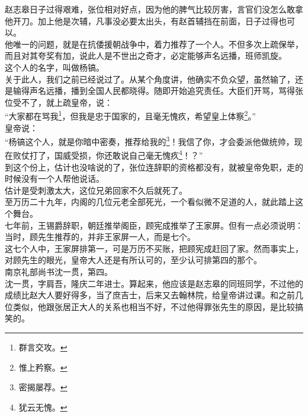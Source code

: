\begin{multicols}{\theparacolNo}
赵志皋日子过得艰难，张位相对好点，因为他的脾气比较厉害，言官们没怎么敢拿他开刀。加上他是次辅，凡事没必要太出头，有赵首辅挡在前面，日子过得也可以。\\

他唯一的问题，就是在抗倭援朝战争中，着力推荐了一个人。不但多次上疏保举，而且对其夸奖有加，说此人是不世出之奇才，必定能够声名远播，班师凯旋。\\

这个人的名字，叫做杨镐。\\

关于此人，我们之前已经说过了。从某个角度讲，他确实不负众望，虽然输了，还是输得声名远播，播到全国人民都晓得。随即开始追究责任。大臣们开骂，骂得张位受不了，就上疏皇帝，说：\\

“大家都在骂我\footnote{群言交攻。}，但我是忠于国家的，且毫无愧疚，希望皇上体察\footnote{惟上矜察。}。”\\

皇帝说：\\

“杨镐这个人，就是你暗中密奏，推荐给我的\footnote{密揭屡荐。}！我信了你，才会委派他做统帅，现在败仗打了，国威受损，你还敢说自己毫无愧疚\footnote{犹云无愧。}！？”\\

到这个份上，估计也没啥说的了，张位连辞职的资格都没有，就被皇帝免职，走的时候没有一个人帮他说话。\\

估计是受刺激太大，这位兄弟回家不久后就死了。\\

至万历二十九年，内阁的几位元老全部死光，一个看似微不足道的人，就此踏上这个舞台。\\

七年前，王锡爵辞职，朝廷推举阁臣，顾宪成推举了王家屏。但有一点必须说明：当时，顾先生推荐的，并非王家屏一人，而是七个。\\

这七个人中，王家屏排第一，可是万历不买账，把顾宪成赶回了家。然而事实上，对顾先生的眼光，皇帝大人还是有所认可的，至少认可排第四的那个。\\

南京礼部尚书沈一贯，第四。\\

沈一贯，字肩吾，隆庆二年进士。算起来，他应该是赵志皋的同班同学，不过他的成绩比赵大人要好得多，当了庶吉士，后来又去翰林院，给皇帝讲过课。和之前几位类似，他跟张居正大人的关系也相当不好，不过他得罪张先生的原因，是比较搞笑的。\\


\end{multicols}
